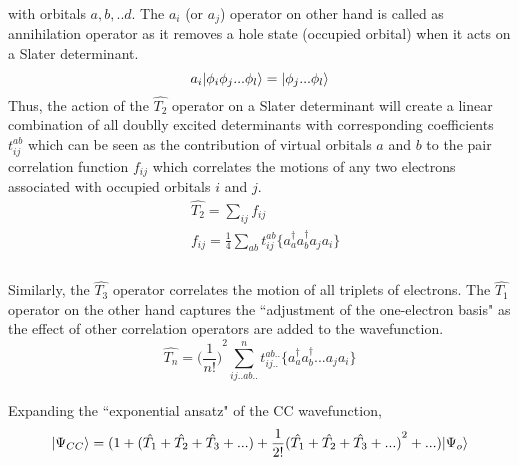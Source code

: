 with orbitals $a,b,..d$. The $a_i$ (or $a_j$) operator on other hand is called 
as annihilation operator as it removes a hole state (occupied orbital) when it 
acts on a Slater determinant.
\begin{equation}
a_i| \phi_i\phi_j...\phi_l \rangle = | \phi_j...\phi_l \rangle
\end{equation}
Thus, the action of the $\hat{T_2} $ operator on a Slater determinant will create a 
linear combination of all doublly excited determinants with corresponding coefficients
$t^{ab}_{ij}$ which can be seen as the contribution of virtual orbitals $a$ and $b$
to the pair correlation function $f_{ij}$ which correlates the motions of any two 
electrons associated with occupied orbitals $i$ and $j$. 
\\
\begin{equation}
\begin{split}
& \hat{T_2} = \sum_{ij}f_{ij} \\
& f_{ij} = \frac{1}{4}\sum_{ab}t^{ab}_{ij}\{a^\dagger_aa^\dagger_ba_ja_i\}\\
\end{split}
\end{equation}
\\
Similarly, the ${\hat{T_3}}$ operator correlates the motion of all triplets of electrons. 
The $\hat{T_1}$ operator on the other hand captures the ``adjustment of the one-electron basis"\cite{}
as the effect of other correlation operators are added to the wavefunction.
\\
\begin{equation}
\hat{T_n} = {\bigg(\frac{1}{n!}\bigg)}^2\sum_{ij..ab..}^nt^{ab..}_{ij..}\{a^\dagger_aa^\dagger_b...a_ja_i\}
\end{equation}
\\
Expanding the ``exponential ansatz" of the CC wavefunction,
\\
\begin{equation}
| \Psi_{CC} \rangle = (1+(\hat{T_1} + \hat{T_2} + \hat{T_3} + ... ) + \frac{1}{2!}{(\hat{T_1} + \hat{T_2} + \hat{T_3} + ...)}^2 + ... )| \Psi_o \rangle
\end{equation}
